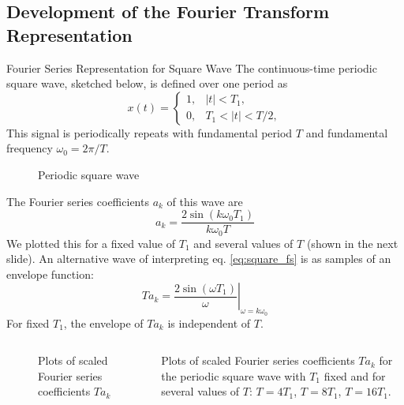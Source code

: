 \subsection{Development of the Fourier Transform Representation}

\begin{frame}[plain]{Fourier Series Representation for Square Wave}
        The continuous-time periodic square wave, sketched below, is defined over one period as
        \begin{equation*}
            x(t) = \begin{cases}
                1, & |t| <T_1,\\
                0, & T_1 < |t| < T/2,
            \end{cases}
        \end{equation*}
        This signal is periodically repeats with fundamental period $T$ and fundamental frequency $\omega_0 = 2\pi/T$.
    {
        \begin{figure}
          \centering
          
          \caption{Periodic square wave}\label{fi:example02_periodic_square_wave }
        \end{figure}
    }
\end{frame}



\begin{frame}
    The Fourier series coefficients $a_k$ of this wave are
    \begin{equation}\label{eq:square_fs}
        a_k = \frac{2\sin(k\omega_0T_1)}{k\omega_0T}
    \end{equation}
    We plotted this for a fixed value of $T_1$ and several values of $T$ (shown in the next slide). An alternative wave of interpreting eq. \ref{eq:square_fs} is as samples of an envelope function:
    \begin{equation*}
        Ta_k = \left.\frac{2\sin(\omega T_1)}{\omega}\right|_{\omega=k\omega_0}
    \end{equation*}
    For fixed $T_1$, the envelope of $Ta_k$ is independent of $T$.

\end{frame}

\begin{frame}[plain,t]
    \begin{columns}
        {
        \begin{figure}
          \centering
          
          \caption{Plots of scaled Fourier series coefficients $Ta_k$}\label{fi:example02_periodic_square_fs}
        \end{figure}
        }
        {
            \small
            \noindent Plots of scaled Fourier series coefficients $Ta_k$ for the periodic square wave with $T_1$ fixed and for several values of $T$: $T=4T_1$, $T=8T_1$, $T=16T_1$.

        }
    \end{columns}
\end{frame}


